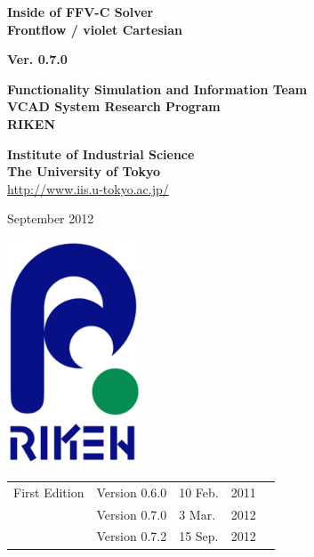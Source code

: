 \documentclass[a4paper,10pt,oneside,fleqn]{jsbook}
\begin{document}
\begin{titlepage}
\begin{center}
\vspace*{3cm}
{\huge \textbf{Inside of FFV-C Solver}}\\
\vspace{0.2cm}
{\huge \textbf{Frontflow / violet Cartesian}}\\
\vspace{1cm}

{\large \textbf{Ver. 0.7.0}}\\
\vspace{1.5cm}

{\large \textbf{Functionality Simulation and Information Team}\\
\large \textbf{VCAD System Research Program}\\
\large \textbf{RIKEN}\\
\vspace{1cm}
}

\large \textbf{Institute of Industrial Science}\\
\large \textbf{The University of Tokyo}\\

\url{http://www.iis.u-tokyo.ac.jp/}\\
\vspace{1cm}

September 2012\\
\vspace{4cm}

\includegraphics[width=4cm,bb=-80 0 220 500]{RIKEN_logo_300x500.eps}

\end{center}
\end{titlepage}
\newpage

%
\frontmatter

\begin{tabular}{llllr}
First Edition  &  Version 0.6.0  & 10 Feb.  & 2011\\
               &  Version 0.7.0  &  3 Mar.  & 2012\\
               &  Version 0.7.2  &  15 Sep.  & 2012


\end{tabular}
\end{document}

